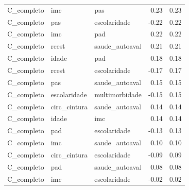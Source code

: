 \begin{tabular}{lllrr}
C_completo & imc & pas & 0.23 & 0.23 \\
C_completo & pas & escolaridade & -0.22 & 0.22 \\
C_completo & imc & pad & 0.22 & 0.22 \\
C_completo & rcest & saude_autoaval & 0.21 & 0.21 \\
C_completo & idade & pad & 0.18 & 0.18 \\
C_completo & rcest & escolaridade & -0.17 & 0.17 \\
C_completo & pas & saude_autoaval & 0.15 & 0.15 \\
C_completo & escolaridade & multimorbidade & -0.15 & 0.15 \\
C_completo & circ_cintura & saude_autoaval & 0.14 & 0.14 \\
C_completo & idade & imc & 0.14 & 0.14 \\
C_completo & pad & escolaridade & -0.13 & 0.13 \\
C_completo & imc & saude_autoaval & 0.10 & 0.10 \\
C_completo & circ_cintura & escolaridade & -0.09 & 0.09 \\
C_completo & pad & saude_autoaval & 0.08 & 0.08 \\
C_completo & imc & escolaridade & -0.02 & 0.02 \\
\bottomrule
\end{tabular}
